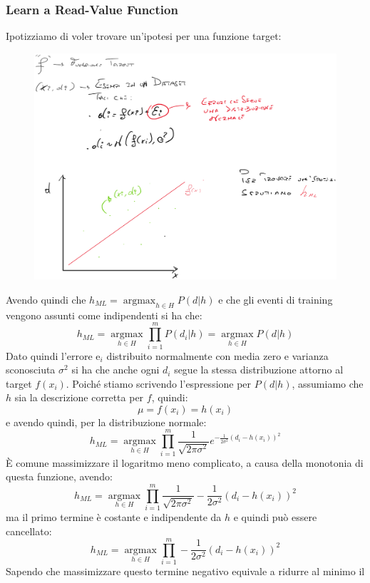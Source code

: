 \subsubsection{Learn a Read-Value Function}
Ipotizziamo di voler trovare un'ipotesi per una funzione target:
\begin{figure}[H]
    \centering
    \includegraphics[width=1\textwidth]{img/hml.png}
\end{figure}
Avendo quindi che $h_{ML}=\operatorname*{argmax}_{h\in H}P(d|h)$ e che gli
eventi di training vengono assunti come indipendenti si ha che:
\[h_{ML}=\operatorname*{argmax}_{h\in H}\prod_{i=1}^mP(d_i|h) = \operatorname*{argmax}_{h\in H}P(d|h) \]
Dato quindi l'errore e$_i$ distribuito normalmente con media zero e varianza
sconosciuta $\sigma^2$ si ha che anche ogni $d_i$ segue la stessa
distribuzione attorno al target $f(x_i)$. Poiché stiamo scrivendo l'espressione
per $P(d|h)$, assumiamo che $h$ sia la descrizione corretta per $f$, quindi:
\[\mu=f(x_i)=h(x_i)\]
e avendo quindi, per la distribuzione normale:
\[h_{ML}=\operatorname*{argmax}_{h\in H}
  \prod_{i=1}^m\frac{1}{\sqrt{2\pi\sigma^2}}
  e^{-\frac{1}{2\sigma^2}(d_i-h(x_i))^2}\]
È comune massimizzare il logaritmo meno complicato, a causa della monotonia di
questa funzione, avendo:
\[h_{ML}=\operatorname*{argmax}_{h\in
    H}\prod_{i=1}^m\frac{1}{\sqrt{2\pi\sigma^2}}
  -\frac{1}{2\sigma^2}(d_i-h(x_i))^2\]
ma il primo termine è costante e indipendente da $h$ e quindi può essere
cancellato:
\[h_{ML}=\operatorname*{argmax}_{h\in
    H}\prod_{i=1}^m -\frac{1}{2\sigma^2}(d_i-h(x_i))^2\]
Sapendo che massimizzare questo termine negativo equivale a ridurre al minimo il
